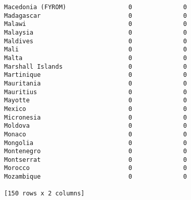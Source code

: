 \documentclass[11pt]{article}
\begin{document}
\begin{Verbatim}[commandchars=\\\{\}]
Macedonia (FYROM)                 0              0
Madagascar                        0              0
Malawi                            0              0
Malaysia                          0              0
Maldives                          0              0
Mali                              0              0
Malta                             0              0
Marshall Islands                  0              0
Martinique                        0              0
Mauritania                        0              0
Mauritius                         0              0
Mayotte                           0              0
Mexico                            0              0
Micronesia                        0              0
Moldova                           0              0
Monaco                            0              0
Mongolia                          0              0
Montenegro                        0              0
Montserrat                        0              0
Morocco                           0              0
Mozambique                        0              0

[150 rows x 2 columns]

    \end{Verbatim}
\end{document}
